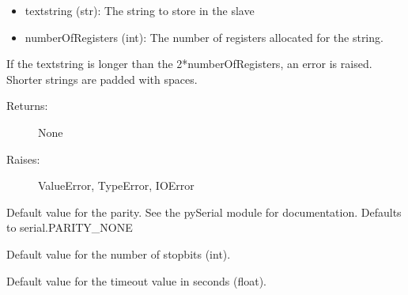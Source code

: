 \documentclass[letterpaper,10pt,english]{sphinxmanual}
\begin{document}
\begin{fulllineitems}
\begin{fulllineitems}
\begin{description}
\begin{itemize}
\item {} 
textstring (str): The string to store in the slave

\item {} 
numberOfRegisters (int): The number of registers allocated for the string.

\end{itemize}

\end{description}

If the textstring is longer than the 2*numberOfRegisters, an error is raised.
Shorter strings are padded with spaces.
\begin{description}
\item[{Returns:}] \leavevmode
None

\item[{Raises:}] \leavevmode
ValueError, TypeError, IOError

\end{description}

\end{fulllineitems}


\end{fulllineitems}


\begin{fulllineitems}
\label{minimalmodbus:minimalmodbus.PARITY}
Default value for the parity. See the pySerial module for documentation. Defaults to serial.PARITY\_NONE

\end{fulllineitems}


\begin{fulllineitems}
\label{minimalmodbus:minimalmodbus.STOPBITS}
Default value for the number of stopbits (int).

\end{fulllineitems}


\begin{fulllineitems}
\label{minimalmodbus:minimalmodbus.TIMEOUT}
Default value for the timeout value in seconds (float).

\end{fulllineitems}
\end{document}
